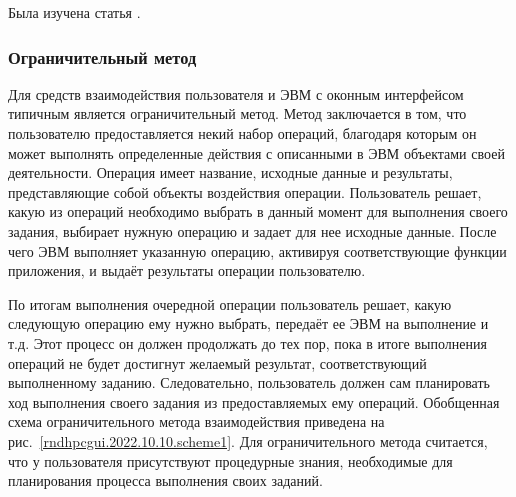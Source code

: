 \def\notedate{2022.10.10}
\def\currentauthor{Василян А.Р. (РК6-73Б)}

Была изучена статья \cite{Sankovsky1998}.

\subsubsection{Ограничительный метод}

Для средств взаимодействия пользователя и ЭВМ с оконным интерфейсом типичным является ограничительный метод. Метод заключается в том, что пользователю предоставляется некий набор операций, благодаря которым он может выполнять определенные действия с описанными в ЭВМ объектами своей деятельности. Операция имеет название, исходные данные и результаты, представляющие собой объекты воздействия операции. Пользователь решает, какую из операций необходимо выбрать в данный момент для выполнения своего задания, выбирает нужную операцию и задает для нее исходные данные. После чего ЭВМ выполняет указанную операцию, активируя соответствующие функции приложения, и выдаёт результаты операции пользователю. 

По итогам выполнения очередной операции пользователь решает, какую следующую операцию ему нужно выбрать, передаёт ее ЭВМ на выполнение и т.д. Этот процесс он должен продолжать до тех пор, пока в итоге выполнения операций не будет достигнут желаемый результат, соответствующий выполненному заданию. Следовательно, пользователь должен сам планировать ход выполнения своего задания из предоставляемых ему операций. Обобщенная схема ограничительного метода взаимодействия приведена на рис.~\ref{rndhpcgui.2022.10.10.scheme1}. Для ограничительного метода считается, что у пользователя присутствуют процедурные знания, необходимые для планирования процесса выполнения своих заданий.

